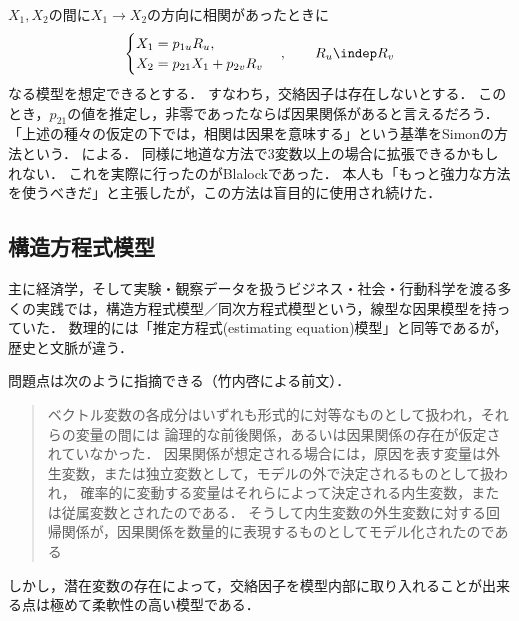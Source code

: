 \documentclass[uplatex,dvipdfmx]{jsreport}
\begin{document}
\begin{example}
    $X_1,X_2$の間に$X_1\to X_2$の方向に相関があったときに
    \[\begin{cases}
        X_1=p_{1u}R_u,\\
        X_2=p_{21}X_1+p_{2v}R_v
    \end{cases},\qquad R_u\indep R_v\]
    なる模型を想定できるとする．
    すなわち，交絡因子は存在しないとする．
    このとき，$p_{21}$の値を推定し，非零であったならば因果関係があると言えるだろう．
    「上述の種々の仮定の下では，相関は因果を意味する」という基準をSimonの方法という．
    \cite{Herbert-Simon57-ModelsOfMan}による．
    同様に地道な方法で3変数以上の場合に拡張できるかもしれない．
    これを実際に行ったのがBlalockであった．
    本人も「もっと強力な方法を使うべきだ」と主張したが，この方法は盲目的に使用され続けた．
\end{example}

\subsection{構造方程式模型}

\begin{tcolorbox}[colframe=ForestGreen, colback=ForestGreen!10!white,breakable,colbacktitle=ForestGreen!40!white,coltitle=black,fonttitle=\bfseries\sffamily,
title=]
    主に経済学，そして実験・観察データを扱うビジネス・社会・行動科学を渡る多くの実践では，構造方程式模型／同次方程式模型という，線型な因果模型を持っていた\cite{Hoyer-Shimizu-08}．
    数理的には「推定方程式(estimating equation)模型」と同等であるが，
    歴史と文脈が違う．
\end{tcolorbox}

\begin{problem}[因果関係の暗黙的取り扱い]
    問題点は次のように指摘できる（竹内啓による前文\cite{統計科学のフロンティア5}）．
    \begin{quote}
        ベクトル変数の各成分はいずれも形式的に対等なものとして扱われ，それらの変量の間には
        論理的な前後関係，あるいは因果関係の存在が仮定されていなかった．
        因果関係が想定される場合には，原因を表す変量は外生変数，または独立変数として，モデルの外で決定されるものとして扱われ，
        確率的に変動する変量はそれらによって決定される内生変数，または従属変数とされたのである．
        そうして内生変数の外生変数に対する回帰関係が，因果関係を数量的に表現するものとしてモデル化されたのである\cite{統計科学のフロンティア5}
    \end{quote}
    しかし，潜在変数の存在によって，交絡因子を模型内部に取り入れることが出来る点は極めて柔軟性の高い模型である．
\end{problem}
\end{document}
